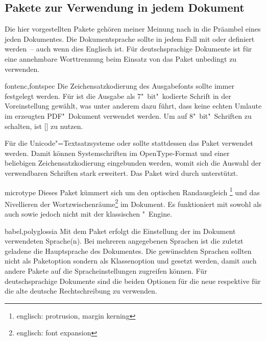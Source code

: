 \subsection{Pakete zur Verwendung in jedem Dokument}
%
Die hier vorgestellten Pakete gehören meiner Meinung nach in die Präambel eines 
jeden Dokumentes. Die Dokumentsprache sollte in jedem Fall mit  
oder  definiert werden~-- auch wenn dies Englisch ist. Für 
deutschsprachige Dokumente ist für eine annehmbare Worttrennung beim Einsatz 
von  das Paket  unbedingt zu verwenden.

\begin{packages}
\item[fontenc,fontspec]
  Die Zeichensatzkodierung des Ausgabefonts sollte immer festgelegt werden. Für 
   ist die Ausgabe als 7"~bit"~kodierte Schrift in der 
  Voreinstellung gewählt, was unter anderem dazu führt, dass keine echten
  Umlaute im erzeugten PDF"~Dokument verwendet werden. Um auf 8"~bit"~Schriften
  zu schalten, ist [] zu
  nutzen.
  
  Für die Unicode"=Textsatzsysteme  oder  
  sollte stattdessen das Paket  verwendet werden. Damit 
  können Systemschriften im OpenType-Format und einer beliebigen 
  Zeichensatzkodierung eingebunden werden, womit sich die Auswahl der 
  verwendbaren Schriften stark erweitert. Das Paket wird durch \TUDScript 
  unterstützt.
\item[microtype]
  Dieses Paket kümmert sich um den optischen Randausgleich%
  \footnote{englisch: protrusion, margin kerning} und das Nivellieren der
  Wortzwischenräume\footnote{englisch: font expansion}
  im Dokument. Es funktioniert mit sowohl  als auch 
   sowie  jedoch nicht mit der klassischen 
  "~Engine.
\item[babel,polyglossia]
  Mit dem Paket  erfolgt die Einstellung der im Dokument 
  verwendeten Sprache(n). Bei mehreren angegebenen Sprachen ist die zuletzt 
  geladene die Hauptsprache des Dokumentes. Die gewünschten Sprachen sollten 
  nicht als Paketoption sondern als Klassenoption und gesetzt werden, damit 
  auch andere Pakete auf die Spracheinstellungen zugreifen können. Für 
  deutschsprachige Dokumente sind die beiden Optionen  für die 
  neue respektive  für die alte deutsche Rechtschreibung zu 
  verwenden. 
  

\end{packages}
